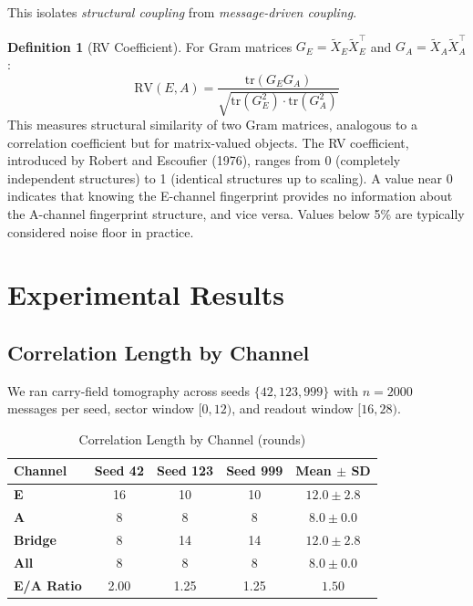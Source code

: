 \documentclass[11pt,a4paper]{article}
\theoremstyle{plain}
\theoremstyle{definition}
\newtheorem{definition}[theorem]{Definition}
\theoremstyle{remark}
\begin{document}
This isolates \emph{structural coupling} from \emph{message-driven coupling}.

\begin{definition}[RV Coefficient]
For Gram matrices $G_E = \tilde{X}_E \tilde{X}_E^\top$ and $G_A = \tilde{X}_A \tilde{X}_A^\top$:
\begin{equation}
    \mathrm{RV}(E, A) = \frac{\mathrm{tr}(G_E G_A)}{\sqrt{\mathrm{tr}(G_E^2) \cdot \mathrm{tr}(G_A^2)}}
\end{equation}
This measures structural similarity of two Gram matrices, analogous to a correlation coefficient but for matrix-valued objects. The RV coefficient, introduced by Robert and Escoufier (1976), ranges from 0 (completely independent structures) to 1 (identical structures up to scaling). A value near 0 indicates that knowing the E-channel fingerprint provides no information about the A-channel fingerprint structure, and vice versa. Values below 5\% are typically considered noise floor in practice.
\end{definition}

\section{Experimental Results}

\subsection{Correlation Length by Channel}

We ran carry-field tomography across seeds $\{42, 123, 999\}$ with $n = 2000$ messages per seed, sector window $[0, 12)$, and readout window $[16, 28)$.

\begin{table}[h]
\centering
\caption{Correlation Length by Channel (rounds)}
\label{tab:corr_length}
\begin{tabular}{lcccc}
\toprule
Channel & Seed 42 & Seed 123 & Seed 999 & Mean $\pm$ SD \\
\midrule
\textbf{E} & 16 & 10 & 10 & $\mathbf{12.0 \pm 2.8}$ \\
\textbf{A} & 8 & 8 & 8 & $\mathbf{8.0 \pm 0.0}$ \\
\textbf{Bridge} & 8 & 14 & 14 & $12.0 \pm 2.8$ \\
\textbf{All} & 8 & 8 & 8 & $8.0 \pm 0.0$ \\
\midrule
\textbf{E/A Ratio} & 2.00 & 1.25 & 1.25 & $\mathbf{1.50}$ \\
\bottomrule
\end{tabular}
\end{table}
\end{document}
